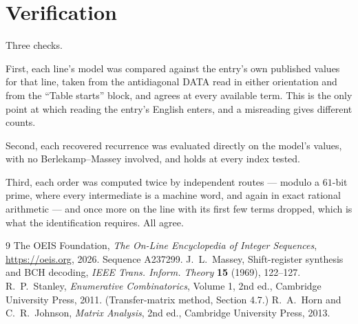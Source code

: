 \documentclass[11pt,a4paper]{article}
\theoremstyle{plain}
\theoremstyle{definition}
\begin{document}
\section{Verification}

Three checks.

First, each line's model was compared against the entry's own published values for that line,
taken from the antidiagonal DATA read in either orientation and from the ``Table starts''
block, and agrees at every available term. This is the only point at which reading the entry's
English enters, and a misreading gives different counts.

Second, each recovered recurrence was evaluated directly on the model's values, with no
Berlekamp--Massey involved, and holds at every index tested.

Third, each order was computed twice by independent routes --- modulo a $61$-bit prime, where
every intermediate is a machine word, and again in exact rational arithmetic --- and once more
on the line with its first few terms dropped, which is what the identification requires. All
agree.

\begin{thebibliography}{9}
 The OEIS Foundation, \emph{The On-Line Encyclopedia of Integer
Sequences}, \url{https://oeis.org}, 2026. Sequence A237299.
 J.~L.~Massey, Shift-register synthesis and BCH decoding, \emph{IEEE
Trans. Inform. Theory} \textbf{15} (1969), 122--127.
 R.~P.~Stanley, \emph{Enumerative Combinatorics}, Volume 1, 2nd ed.,
Cambridge University Press, 2011. (Transfer-matrix method, Section 4.7.)
 R.~A.~Horn and C.~R.~Johnson, \emph{Matrix Analysis}, 2nd ed., Cambridge
University Press, 2013.
\end{thebibliography}
\end{document}
